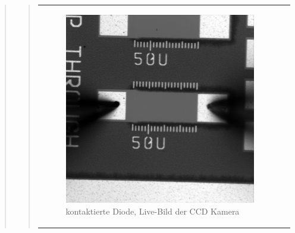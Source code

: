 \begin{quote}
\begin{quote}
\begin{center}
\begin{tabular}{ll}
                \hspace{-10em}
                    \begin{minipage}{0.6\textwidth}

                        \begin{figure}[H]
                            \label{fig:wwwerwerew}
                            \includegraphics[scale=0.25, trim = 0cm 0cm 0cm
                            0cm,
                            clip]{./Emissionsbilder/vier/nach_Kontaktierung.png}
                            \caption{kontaktierte Diode, Live-Bild der CCD
                            Kamera}
                        \end{figure}

                    \end{minipage}
                    \begin{minipage}{0.6\textwidth}


\end{minipage}
\end{tabular}
\end{center}
\end{quote}
\end{quote}
